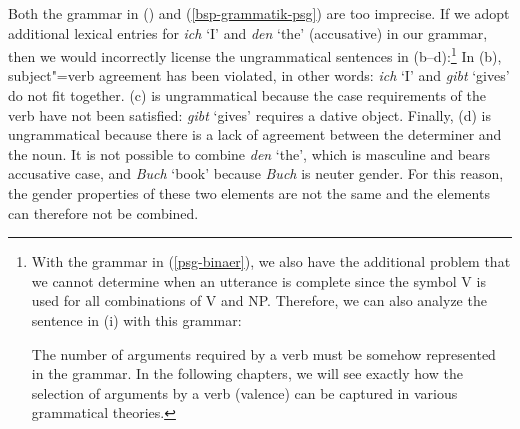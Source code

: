 Both the grammar in () and (\ref{bsp-grammatik-psg}) are too imprecise.
If we adopt additional lexical entries for \emph{ich} `I' and \emph{den} `the' (accusative) in our grammar, then we would incorrectly
license the ungrammatical sentences in (b--d):\footnote{
	With the grammar in (\ref{psg-binaer}), we also have the additional problem that we cannot determine when an utterance is complete
	since the symbol V is used for all combinations of V and NP. Therefore, we can also analyze the sentence in (i) with this grammar:
  
\eal
{}
\zl
The number of arguments required by a verb must be somehow represented in the grammar. In the following chapters, we will see exactly
how the selection of arguments by a verb (valence) can be captured in various grammatical theories.
}
\eal
{}
\zl
In (b), subject"=verb agreement has been violated, in other words: \emph{ich} `I' and \emph{gibt} `gives' do not fit together.
(c) is ungrammatical because the case requirements of the verb have not been satisfied: \emph{gibt} `gives' requires a dative object. Finally, (d) is ungrammatical
because there is a lack of agreement between the determiner and the noun. It is not possible to combine \emph{den} `the', which is masculine and bears accusative case, 
and \emph{Buch} `book' because \emph{Buch} is neuter gender. For this reason, the gender properties
of these two elements are not the same and the elements can therefore not be combined.

